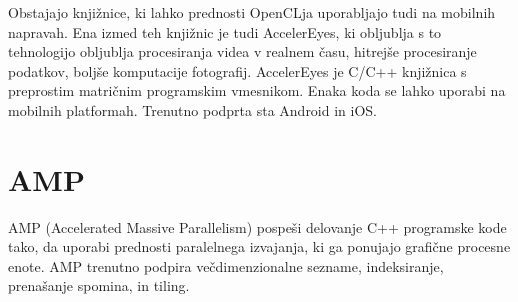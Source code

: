 Obstajajo knjižnice, ki lahko prednosti OpenCLja uporabljajo tudi na mobilnih napravah. Ena izmed teh knjižnic je tudi AccelerEyes, ki obljublja s to tehnologijo obljublja procesiranja videa v realnem času, hitrejše procesiranje podatkov, boljše komputacije fotografij. AccelerEyes je C/C++ knjižnica s preprostim matričnim programskim vmesnikom. Enaka koda se lahko uporabi na mobilnih platformah. Trenutno podprta sta Android in iOS.

\section{AMP}

AMP (Accelerated Massive Parallelism) pospeši delovanje C++ programske kode tako, da uporabi prednosti paralelnega izvajanja, ki ga ponujajo grafične procesne enote. AMP trenutno podpira večdimenzionalne sezname, indeksiranje, prenašanje spomina, in tiling.

